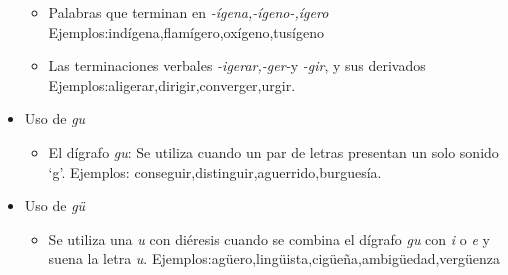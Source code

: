 \documentclass[a4paper,12pt]{article}
\begin{document}
\begin{itemize}
{\begin{itemize}
\phantom{3em}Ejemplos:regional,prodigioso,original,panegírico.
\item Palabras que terminan en \textit{-ígena,-ígeno-,ígero}\\
\phantom{3em}Ejemplos:indígena,flamígero,oxígeno,tusígeno
\item Las terminaciones verbales \textit{-igerar,-ger-}y \textit{-gir}, y sus derivados\\
\phantom{3em}Ejemplos:aligerar,dirigir,converger,urgir.
\end{itemize}
}
\item{Uso de \textit{gu}
\begin{itemize}
\item El dígrafo \textit{gu}: Se utiliza cuando un par de letras presentan un solo sonido `g'. Ejemplos: conseguir,distinguir,aguerrido,burguesía.
\end{itemize}
}
\item{Uso de \textit{gü}
\begin{itemize}
\item Se utiliza una \textit{u} con diéresis cuando se combina el dígrafo \textit{gu} con \textit{i} o \textit{e} y suena la letra \textit{u}. Ejemplos:agüero,lingüista,cigüeña,ambigüedad,vergüenza
\end{itemize}
}
\end{itemize}
\end{document}
